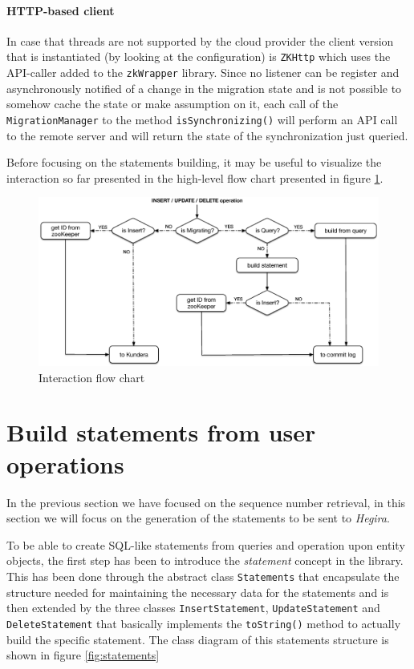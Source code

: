 \paragraph{HTTP-based client} In case that threads are not supported by the cloud provider the client version that is instantiated (by looking at the configuration) is \texttt{ZKHttp} which uses the API-caller added to the \texttt{zkWrapper} library.
Since no listener can be register and asynchronously notified of a change in the migration state and is not possible to somehow cache the state or make assumption on it, each call of the \texttt{MigrationManager} to the method \texttt{isSynchronizing()} will perform an API call to the remote server and will return the state of the synchronization just queried.


\newparagraph Before focusing on the statements building, it may be useful to visualize the interaction so far presented in the high-level flow chart presented in figure \ref{fig:flow-chart}.

\begin{figure}[tbh]
  \centering
  \includegraphics[width=13.5cm]{images/flow_chart}
  \caption{Interaction flow chart}
  \label{fig:flow-chart}
\end{figure} 

\section{Build statements from user operations}
\label{sec:statements}
In the previous section we have focused on the sequence number retrieval, in this section we will focus on the generation of the statements to be sent to \textit{Hegira}.

\newparagraph To be able to create SQL-like statements from queries and operation upon entity objects, the first step has been to introduce the \textit{statement} concept in the library. This has been done through the abstract class \texttt{Statements} that encapsulate the structure needed for maintaining the necessary data for the statements and is  then extended by the three classes \texttt{InsertStatement}, \texttt{UpdateStatement} and \texttt{DeleteStatement} that basically implements the \texttt{toString()} method to actually build the specific statement.
The class diagram of this statements structure is shown in figure \ref{fig:statements}

